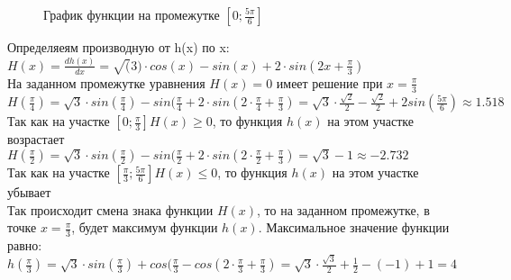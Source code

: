 \documentclass[russian,utf8,nocolumnxxxi,nocolumnxxxii]{eskdtext}
\begin{document}
\begin{enumerate}
    \begin{figure}[h]
    \centering
        \caption{График функции на промежутке $[0;\frac{5\pi}{6}]$}
    \end{figure}
\newpage
Определяеям производную от h(x) по x:\\
\vspace{3mm}
$H(x)=\frac{dh(x)}{dx}=\sqrt(3)\cdot cos(x) - sin(x) +2\cdot sin(2x+\frac{\pi}{3})$\\
\vspace{3mm}
На заданном промежутке уравнения $H(x)=0$ имеет решение при $x=\frac{\pi}{3}$\\
\vspace{3mm}
$H(\frac{\pi}{4})=\sqrt{3}\cdot sin(\frac{\pi}{4})- sin(\frac{\pi}{4}+2\cdot sin(2\cdot \frac{\pi}{4} + \frac{\pi}{3}) = \sqrt{3}\cdot \frac{\sqrt2}{2}-\frac{\sqrt{2}}{2}+2sin(\frac{5\pi}{6})\approx 1.518$\\
\vspace{3mm}
Так как на участке $[0;\frac{\pi}{3}] H(x) \geqslant 0$, то функция $h(x)$ на этом участке возрастает\\
\vspace{3mm}
$H(\frac{\pi}{2})=\sqrt{3}\cdot sin(\frac{\pi}{2})- sin(\frac{\pi}{2}+2\cdot sin(2\cdot \frac{\pi}{2} + \frac{\pi}{3}) = \sqrt{3}-1\approx -2.732$\\
\vspace{3mm}
Так как на участке $[\frac{\pi}{3};\frac{5\pi}{6}] H(x) \leqslant 0$, то функция $h(x)$ на этом участке убывает\\
\vspace{3mm}
Так происходит смена знака функции $H(x)$, то на заданном промежутке, в точке $x=\frac{\pi}{3}$, будет максимум функции $h(x)$. Максимальное значение функции равно:\\
\vspace{3mm}
$h(\frac{\pi}{3})=\sqrt{3}\cdot sin(\frac{\pi}{3})+ cos(\frac{\pi}{3}- cos(2\cdot \frac{\pi}{3} + \frac{\pi}{3}) = \sqrt{3} \cdot \frac{\sqrt{3}}{2}  + \frac{1}{2}- (-1)+1 = 4$\\

\end{enumerate}
\end{document}
